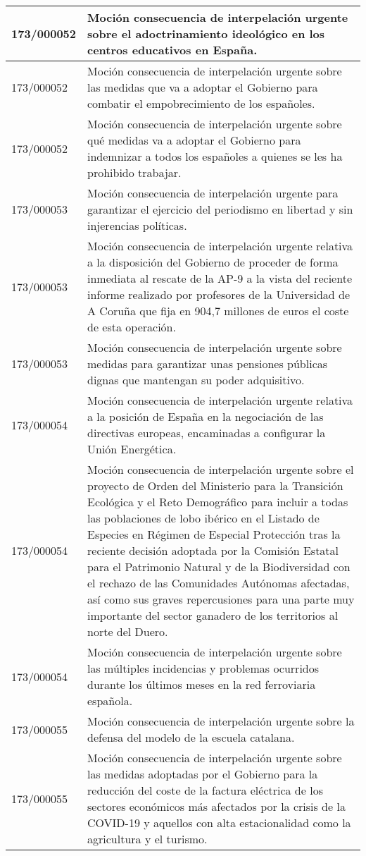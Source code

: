 {\begin{table}[H]
\begin{center}
\begin{tabularx}{\linewidth}{| l | X |}
\hline
173/000052 & Moción consecuencia de interpelación urgente sobre el adoctrinamiento ideológico en los centros educativos en España. \\
\hline
173/000052 & Moción consecuencia de interpelación urgente sobre las medidas que va a adoptar el Gobierno para combatir el empobrecimiento de los españoles. \\
\hline
173/000052 & Moción consecuencia de interpelación urgente sobre qué medidas va a adoptar el Gobierno para indemnizar a todos los españoles a quienes se les ha prohibido trabajar. \\
\hline
173/000053 & Moción consecuencia de interpelación urgente para garantizar el ejercicio del periodismo en libertad y sin injerencias políticas. \\
\hline
173/000053 & Moción consecuencia de interpelación urgente relativa a la disposición del Gobierno de proceder de forma inmediata al rescate de la AP-9 a la vista del reciente informe realizado por profesores de la Universidad de A Coruña que fija en 904,7 millones de euros el coste de esta operación. \\
\hline
173/000053 & Moción consecuencia de interpelación urgente sobre medidas para garantizar unas pensiones públicas dignas que mantengan su poder adquisitivo. \\
\hline
173/000054 & Moción consecuencia de interpelación urgente relativa a la posición de España en la negociación de las directivas europeas, encaminadas a configurar la Unión Energética. \\
\hline
173/000054 & Moción consecuencia de interpelación urgente sobre el proyecto de Orden del Ministerio para la Transición Ecológica y el Reto Demográfico para incluir a todas las poblaciones de lobo ibérico en el Listado de Especies en Régimen de Especial Protección tras la reciente decisión adoptada por la Comisión Estatal para el Patrimonio Natural y de la Biodiversidad con el rechazo de las Comunidades Autónomas afectadas, así como sus graves repercusiones para una parte muy importante del sector ganadero de los territorios al norte del Duero. \\
\hline
173/000054 & Moción consecuencia de interpelación urgente sobre las múltiples incidencias y problemas ocurridos durante los últimos meses en la red ferroviaria española. \\
\hline
173/000055 & Moción consecuencia de interpelación urgente sobre la defensa del modelo de la escuela catalana. \\
\hline
173/000055 & Moción consecuencia de interpelación urgente sobre las medidas adoptadas por el Gobierno para la reducción del coste de la factura eléctrica de los sectores económicos más afectados por la crisis de la COVID-19 y aquellos con alta estacionalidad como la agricultura y el turismo. \\

\end{tabularx}
\end{center}
\end{table}}
